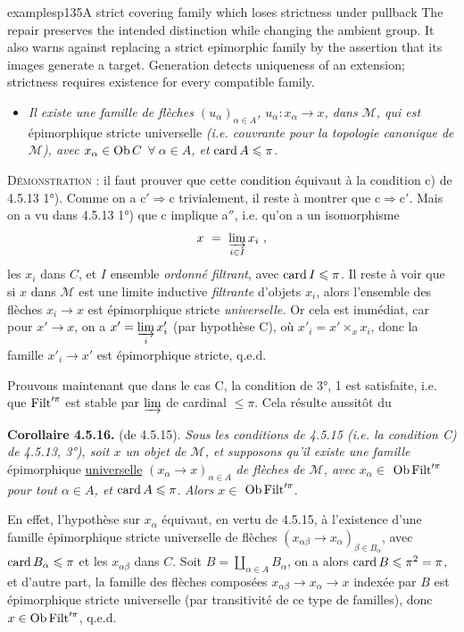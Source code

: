 \begin{dcomment}{examples}{p135}{A strict covering family which loses strictness under pullback}
The repair preserves the intended distinction while changing the ambient group. It also warns against replacing a strict epimorphic family by the assertion that its images generate a target. Generation detects uniqueness of an extension; strictness requires existence for every compatible family.
\end{dcomment}


\begin{itemize}
\item[\textit{c$'$)}] \textit{Il existe une famille de flèches $(u_{\alpha})_{\alpha\in A}$, $u_{\alpha} : x_{\alpha} \longrightarrow x$, dans $\mathcal{M}$, qui est} épimorphique stricte universelle \textit{(i.e. couvrante pour la topologie canonique de $\mathcal{M}$), avec $x_{\alpha} \in \operatorname{Ob} C$ $\forall\ \alpha \in A$, et} $\operatorname{card} A \leqslant \pi$.
\end{itemize}
\textsc{Démonstration} : il faut prouver que cette condition équivaut à la condition c) de 4.5.13 1°). Comme on a $\mathrm{c}' \Longrightarrow \mathrm{c}$ trivialement, il reste à montrer que $\mathrm{c} \Longrightarrow \mathrm{c}'$. Mais on a vu dans 4.5.13 1°) que c implique a$''$, i.e. qu'on a un isomorphisme
\[ x \ = \ \varinjlim_{i\in I} x_i \ , \]
les $x_i$ dans $C$, et $I$ ensemble \textit{ordonné filtrant}, avec $\operatorname{card} I \leqslant \pi$. Il reste à voir que si $x$ dans $\mathcal{M}$ est une limite inductive \textit{filtrante} d'objets $x_i$, alors l'ensemble des flèches $x_i \longrightarrow x$ est épimorphique stricte \textit{universelle.} Or cela est immédiat, car pour $x' \longrightarrow x$, on a $x' = \varinjlim\limits_{i} x'_i$ (par hypothèse C), où $x'_i = x' \times_x x_i$, donc la famille $x'_i \longrightarrow x'$ est épimorphique stricte, q.e.d.

Prouvons maintenant que dans le cas C, la condition de 3°, 1 est satisfaite, i.e. que $\operatorname{Filt}'^{\pi}$ est stable par $\varinjlim$ de cardinal $\leqslant \pi$. Cela
résulte aussitôt du

\textbf{Corollaire 4.5.16.} (de 4.5.15). \textit{Sous les conditions de 4.5.15 (i.e. la condition C) de 4.5.13, 3°), soit $x$ un objet de $\mathcal{M}$, et supposons qu'il existe une famille} épimorphique \underline{universelle} $(x_{\alpha} \longrightarrow x)_{\alpha\in A}$ \textit{de flèches de $\mathcal{M}$, avec $x_{\alpha} \in$} $\operatorname{Ob} \operatorname{Filt}'^{\pi}$ \textit{pour tout $\alpha \in A$, et} $\operatorname{card} A \leqslant \pi$. \textit{Alors $x \in$} $\operatorname{Ob} \operatorname{Filt}'^{\pi}$.

En effet, l'hypothèse sur $x_{\alpha}$ équivaut, en vertu de 4.5.15, à l'existence d'une famille épimorphique stricte universelle de flèches $(x_{\alpha\beta} \longrightarrow x_{\alpha})_{\beta\in B_{\alpha}}$, avec $\operatorname{card} B_{\alpha} \leqslant \pi$ et les $x_{\alpha\beta}$ dans $C$. Soit $B = \coprod_{\alpha\in A} B_{\alpha}$, on a alors $\operatorname{card} B \leqslant \pi^2 = \pi$, et d'autre part, la famille des flèches composées $x_{\alpha\beta} \longrightarrow x_{\alpha} \longrightarrow x$ indexée par $B$ est épimorphique stricte universelle (par transitivité de ce type de familles), donc $x \in \operatorname{Ob} \operatorname{Filt}'^{\pi}$, q.e.d.

